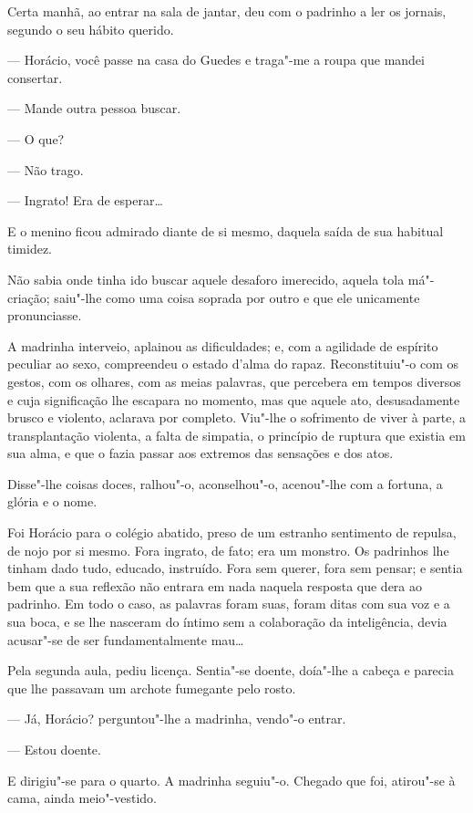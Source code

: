 Certa manhã, ao entrar na sala de jantar, deu com o padrinho a ler os
jornais, segundo o seu hábito querido.

--- Horácio, você passe na casa do Guedes e traga"-me a roupa que mandei
consertar.

--- Mande outra pessoa buscar.

--- O que?

--- Não trago.

--- Ingrato! Era de esperar\ldots{}

E o menino ficou admirado diante de si mesmo, daquela saída de sua
habitual timidez.

Não sabia onde tinha ido buscar aquele desaforo imerecido, aquela tola
má"-criação; saiu"-lhe como uma coisa soprada por outro e que ele
unicamente pronunciasse.

A madrinha interveio, aplainou as dificuldades; e, com a agilidade de
espírito peculiar ao sexo, compreendeu o estado d'alma do rapaz.
Reconstituiu"-o com os gestos, com os olhares, com as meias palavras, que
percebera em tempos diversos e cuja significação lhe escapara no
momento, mas que aquele ato, desusadamente brusco e violento, aclarava
por completo. Viu"-lhe o sofrimento de viver à parte, a transplantação
violenta, a falta de simpatia, o princípio de ruptura que existia em sua
alma, e que o fazia passar aos extremos das sensações e dos atos.

Disse"-lhe coisas doces, ralhou"-o, aconselhou"-o, acenou"-lhe com a
fortuna, a glória e o nome.

Foi Horácio para o colégio abatido, preso de um estranho sentimento de
repulsa, de nojo por si mesmo. Fora ingrato, de fato; era um monstro. Os
padrinhos lhe tinham dado tudo, educado, instruído. Fora sem querer,
fora sem pensar; e sentia bem que a sua reflexão não entrara em nada
naquela resposta que dera ao padrinho. Em todo o caso, as palavras foram
suas, foram ditas com sua voz e a sua boca, e se lhe nasceram do íntimo
sem a colaboração da inteligência, devia acusar"-se de ser
fundamentalmente mau\ldots{}

Pela segunda aula, pediu licença. Sentia"-se doente, doía"-lhe a cabeça e
parecia que lhe passavam um archote fumegante pelo rosto.

--- Já, Horácio? perguntou"-lhe a madrinha, vendo"-o entrar.

--- Estou doente.

E dirigiu"-se para o quarto. A madrinha seguiu"-o. Chegado que foi,
atirou"-se à cama, ainda meio"-vestido.

